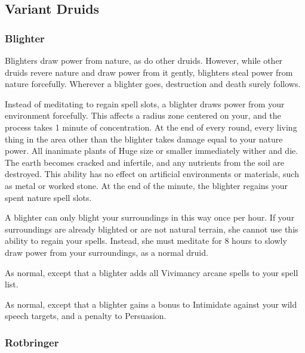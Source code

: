     \subsection{Variant Druids}

        \subsubsection{Blighter}

            Blighters draw power from nature, as do other druids. However, while other druids revere nature and draw power from it gently, blighters steal power from nature forcefully. Wherever a blighter goes, destruction and death surely follows.

             Instead of meditating to regain spell slots, a blighter draws power from your environment forcefully.
            This affects a \areahuge radius zone centered on your, and the process takes 1 minute of concentration.
            At the end of every round, every living thing in the area other than the blighter takes damage equal to your nature power.
            All inanimate plants of Huge size or smaller immediately wither and die.
            The earth becomes cracked and infertile, and any nutrients from the soil are destroyed.
            This ability has no effect on artificial environments or materials, such as metal or worked stone.
            At the end of the minute, the blighter regains your spent nature spell slots.

            A blighter can only blight your surroundings in this way once per hour.
            If your surroundings are already blighted or are not natural terrain, she cannot use this ability to regain your spells.
            Instead, she must meditate for 8 hours to slowly draw power from your surroundings, as a normal druid.

             As normal, except that a blighter adds all Vivimancy arcane spells to your spell list.

             As normal, except that a blighter gains a  bonus to Intimidate against your wild speech targets, and a  penalty to Persuasion.



        \subsubsection{Rotbringer}

